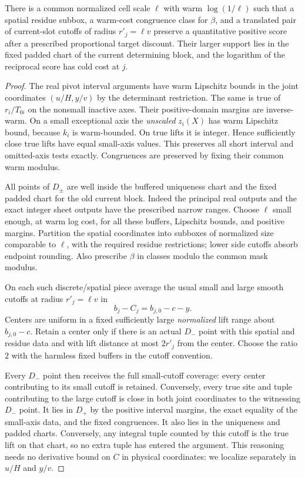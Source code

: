 \begin{lemma}\label{ap:macro:localization}
There is a common normalized cell scale $\ell$ with warm
$\log(1/\ell)$ such that a spatial residue subbox, a warm-cost
congruence class for $\beta$, and a translated pair of current-slot
cutoffs of radius $r'_j=\ell v$ preserve a quantitative positive
score after a prescribed proportional target discount.  Their larger
support lies in the fixed padded chart of the current determining
block, and the logarithm of the reciprocal score has cold cost at $j$.
\end{lemma}

\begin{proof}
The real pivot interval arguments have warm Lipschitz bounds in the
joint coordinates $(u/H,y/v)$ by the determinant restriction.
The same is true of $r_i/T_{0i}$ on the nonsmall inactive axes.
Their positive-domain margins are inverse-warm.  On a small
exceptional axis the \emph{unscaled} $z_i(X)$ has warm Lipschitz
bound, because $k_i$ is warm-bounded.  On true lifts it is integer.
Hence sufficiently close true lifts have equal small-axis values.
This preserves all short interval and omitted-axis tests exactly.
Congruences are preserved by fixing their common warm modulus.

All points of $D_\pm$ are well inside the buffered uniqueness chart
and the fixed padded chart for the old current block.  Indeed the
principal real outputs and the exact integer sheet outputs have the
prescribed narrow ranges.  Choose $\ell$ small enough, at warm log
cost, for all these buffers, Lipschitz bounds, and positive margins.
Partition the spatial coordinates into subboxes of normalized size
comparable to $\ell$, with the required residue restrictions; lower
side cutoffs absorb endpoint rounding.  Also prescribe $\beta$ in
classes modulo the common mask modulus.

On each such discrete/spatial piece average the usual small and large
smooth cutoffs at radius $r'_j=\ell v$ in
\[
                 b_j-C_j=b_{j,0}-c-y.
\]
Centers are uniform in a fixed sufficiently large \emph{normalized}
lift range about $b_{j,0}-c$.  Retain a center only if there is an actual
$D_-$ point with this spatial and residue data and with lift distance
at most $2r'_j$ from the center.  Choose the ratio $2$ with the harmless
fixed buffers in the cutoff convention.

Every $D_-$ point then receives the full small-cutoff coverage: every
center contributing to its small cutoff is retained.  Conversely,
every true site and tuple contributing to the large cutoff is close
in both joint coordinates to the witnessing $D_-$ point.  It lies in
$D_+$ by the positive interval margins, the exact equality of the
small-axis data, and the fixed congruences.  It also lies in the
uniqueness and padded charts.  Conversely, any integral tuple counted
by this cutoff is the true lift on that chart, so no extra tuple has
entered the argument.  This reasoning needs no derivative bound on
$C$ in physical coordinates: we localize separately in $u/H$ and $y/v$.


\end{proof}
